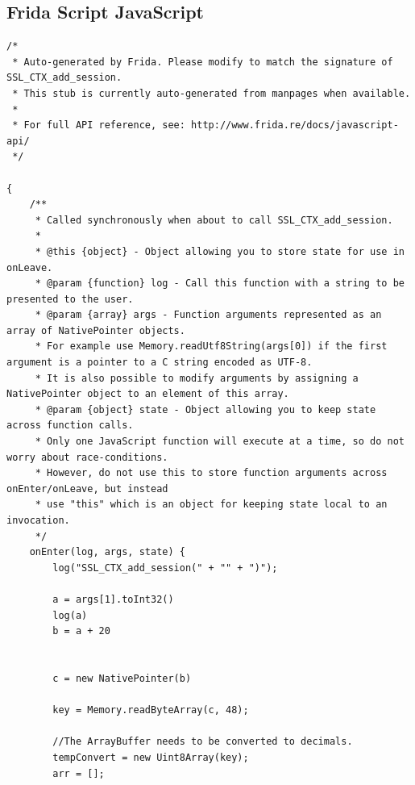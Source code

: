 \documentclass[12pt, a4paper]{report}
\begin{document}
\begin{appendices}


\chapter{Frida Script JavaScript}


 

\begin{lstlisting}[frame=single, breaklines=true]
/*
 * Auto-generated by Frida. Please modify to match the signature of SSL_CTX_add_session.
 * This stub is currently auto-generated from manpages when available.
 *
 * For full API reference, see: http://www.frida.re/docs/javascript-api/
 */

{
    /**
     * Called synchronously when about to call SSL_CTX_add_session.
     *
     * @this {object} - Object allowing you to store state for use in onLeave.
     * @param {function} log - Call this function with a string to be presented to the user.
     * @param {array} args - Function arguments represented as an array of NativePointer objects.
     * For example use Memory.readUtf8String(args[0]) if the first argument is a pointer to a C string encoded as UTF-8.
     * It is also possible to modify arguments by assigning a NativePointer object to an element of this array.
     * @param {object} state - Object allowing you to keep state across function calls.
     * Only one JavaScript function will execute at a time, so do not worry about race-conditions.
     * However, do not use this to store function arguments across onEnter/onLeave, but instead
     * use "this" which is an object for keeping state local to an invocation.
     */
    onEnter(log, args, state) {
        log("SSL_CTX_add_session(" + "" + ")");

		a = args[1].toInt32()
		log(a)
		b = a + 20


		c = new NativePointer(b)

		key = Memory.readByteArray(c, 48);

		//The ArrayBuffer needs to be converted to decimals. 
		tempConvert = new Uint8Array(key);
		arr = [];



\end{lstlisting}
\end{appendices}
\end{document}
